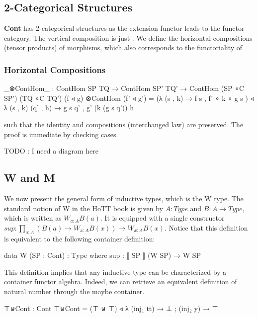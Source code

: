 {\subsection{2-Categorical Structures}

\textbf{Cont} has 2-categorical structures as the extension functor leads to the functor category. The vertical composition is just . We define the horizontal compositions (tensor products) of morphisms, which also corresponds to the functoriality of 

\subsubsection*{Horizontal Compositions}

\begin{code}
_⊗ContHom_ : ContHom SP TQ → ContHom SP' TQ' → ContHom (SP ∘C SP') (TQ ∘C TQ')
(f ◃ g) ⊗ContHom (f' ◃ g') 
  = (λ{ (s , k) → f s , f' ∘ k ∘ g s }) 
  ◃ λ{ (s , k) (q' , h) → g s q' , g' (k (g s q')) h }
\end{code}

such that the identity and compositions (interchanged law) are preserved. The proof is immediate by checking cases.

TODO : I need a diagram here

\subsection{W and M}

We now present the general form of inductive types, which is the W type. The standard notion of W in the HoTT book is given by $A : Type$ and $B : A \to Type$, which is written as $W_{a : A} B (a)$. It is equipped with a single constructor $sup : \prod_{a : A} (B (a) \to W_{x : A} B (x)) \to W_{x : A} B (x)$. Notice that this definition is equivalent to the following container definition:

\begin{code}
data W (SP : Cont) : Type where
  sup : ⟦ SP ⟧ (W SP) → W SP
\end{code}

This definition implies that any inductive type can be characterized by a container functor algebra. Indeed, we can retrieve an equivalent definition of natural number through the maybe container.

\begin{code}
⊤⊎Cont : Cont
⊤⊎Cont = (⊤ ⊎ ⊤) ◃ λ{ (inj₁ tt) → ⊥ ; (inj₂ y) → ⊤ }


\end{code}}
